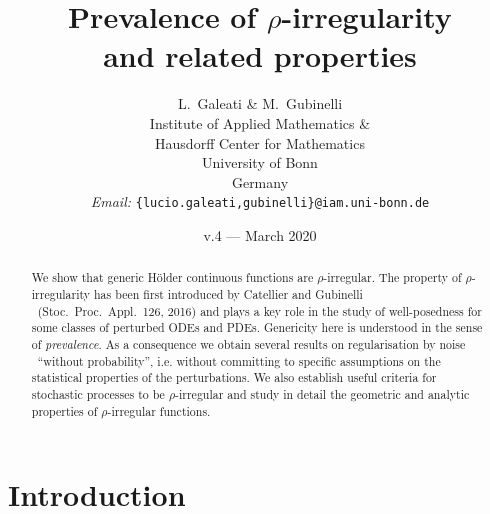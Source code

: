 \documentclass[10pt]{article}
\newcommand{\tmaffiliation}[1]{\\ #1}
\newcommand{\tmemail}[1]{\\ \textit{Email:} \texttt{#1}}
\newcommand{\tmtextit}[1]{{\itshape{#1}}}
\begin{document}
\title{
  Prevalence of $\rho$-irregularity\\
  and related properties
}

\author{
  L.~Galeati \& M.~Gubinelli
  \tmaffiliation{Institute of Applied Mathematics \&\\
  Hausdorff Center for Mathematics\\
  University of Bonn\\
  Germany}
  \tmemail{\{lucio.galeati,gubinelli\}@iam.uni-bonn.de}
}

\date{v.4 --- March 2020}

\maketitle

\begin{abstract}
  We show that generic H{\"o}lder continuous functions are $\rho$-irregular.
  The property of $\rho$-irregularity has been first introduced by Catellier
  and Gubinelli \ (Stoc.~Proc.~Appl.~126, 2016) and plays a key role in the
  study of well-posedness for some classes of perturbed ODEs and PDEs.
  Genericity here is understood in the sense of \tmtextit{prevalence}. As a
  consequence we obtain several results on regularisation by noise \ ``without
  probability'', i.e. without committing to specific assumptions on the
  statistical properties of the perturbations. We also establish useful
  criteria for stochastic processes to be $\rho$-irregular and study in detail
  the geometric and analytic properties of $\rho$-irregular functions.
\end{abstract}

{\tableofcontents}

\section{Introduction}
\end{document}
